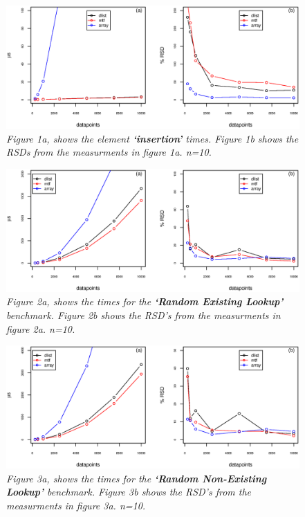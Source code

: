 \documentclass[a4paper,11pt,twoside]{article}
\begin{document}
\begin{figure}[H] 
\centering 
\includegraphics[width=\textwidth]{figures/fig1.eps}
\caption{\textit{Figure 1a, shows the element \textbf{`insertion'}
    times. Figure 1b shows the RSDs from the measurments in figure 1a. n=10.}}
\end{figure}

\begin{figure}[H] 
\centering 
\includegraphics[width=\textwidth]{figures/fig2.eps}
\caption{\textit{Figure 2a, shows the times for the \textbf{`Random Existing
    Lookup'} benchmark. Figure 2b shows the RSD's from the measurments
in figure 2a. n=10.}}
\end{figure}

\begin{figure}[H] 
\centering 
\includegraphics[width=\textwidth]{figures/fig3.eps}
\caption{\textit{Figure 3a, shows the times for the \textbf{`Random
      Non-Existing Lookup'} benchmark. Figure 3b shows the RSD's from
    the measurments in figure 3a. n=10.}}
\end{figure}
\end{document}
